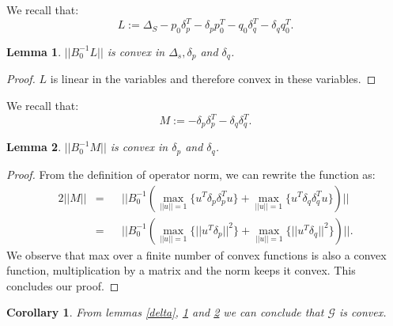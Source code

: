 \documentclass{sig-alternate-05-2015}
\newtheorem{lemma}{Lemma}
\newtheorem{corollary}{Corollary}
\begin{document}
We recall that:
\begin{equation*} 
L:= \Delta_S - p_0\delta_p^T - \delta_pp_0^T - q_0\delta_q^T - \delta_qq_0^T.
\end{equation*}
\begin{lemma} \label{L}
$||B_0^{-1}L||$ is convex in $\Delta_s, \delta_p$
and $\delta_q$.
\end{lemma}
\begin{proof}
$L$ is linear in the variables and therefore convex in these variables.

\end{proof}

We recall that:
\begin{equation*} 
M:= - \delta_p\delta_p^T - \delta_q\delta_q^T.
\end{equation*}

\begin{lemma} \label{M}
$||B_0^{-1}M||$ is convex in $\delta_p$
and $\delta_q$.
\end{lemma}
\begin{proof}
From the definition of operator norm, we can rewrite the function as:
\begin{alignat*} {2}
||M|| & = && ||B_0^{-1}(\max_{||u||=1}{\{u^T \delta_p\delta_p^T u\}} +
\max_{||u||=1}{\{u^T \delta_q\delta_q^T u\}})||\\
& = && ||B_0^{-1}(\max_{||u||=1}{\{||u^T \delta_p||^2\}} +
\max_{||u||=1}{\{||u^T \delta_q||^2\}})||.
\end{alignat*}
We observe that max over a finite number of convex functions is also a convex
function, multiplication by a matrix and the norm keeps it convex.
This concludes our proof.
\end{proof}

\begin{corollary}
From lemmas \ref{delta}, \ref{L} and \ref{M} we can conclude that $\mathcal{G}$
is convex.
\end{corollary}
\end{document}
